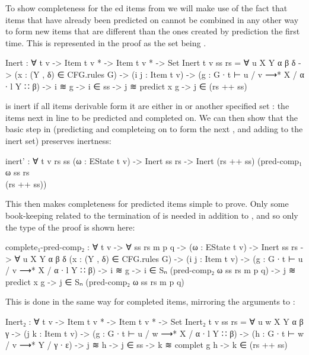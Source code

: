 		To show completeness for the ed items from
		 we will make use of the fact that items that have
		already been predicted on cannot be combined in any other way to form
		new items that are different than the ones created by prediction the
		first time. This is represented in the proof as the set 
		being .

		\begin{code}
			Inert : ∀ {t v} -> Item t v * -> Item t v * -> Set
			Inert {t} {v} ss rs =
			  ∀ {u X Y α β δ} ->
			  (x : (Y , δ) ∈ CFG.rules G) ->
			  (i j : Item t v) ->
			  (g : G ∙ t ⊢ u / v ⟶* X / α ∙ l Y ∷ β) ->
			  i ≋ g -> i ∈ ss ->
			  j ≋ predict x g ->
			    j ∈ (rs ++ ss)
		\end{code}

		 is inert if all items derivable form it are either in
		 or another specified set : the items next in
		line to be predicted and completed on. We can then show that the basic
		step in  (predicting and completeing on 
		to form the next , and adding  to the inert set)
		preserves inertness:

		\begin{code}
			inert' : ∀ {t v rs ss} (ω : EState t v) ->
			  Inert ss rs -> Inert (rs ++ ss) (pred-comp₁ ω ss rs \\ (rs ++ ss))
		\end{code}

		This then makes completeness for  predicted items
		simple to prove. Only some book-keeping related to the termination of
		 is needed in addition to , and so
		only the type of the proof is shown here:

		\begin{code}
			complete₁-pred-comp₂ : ∀ {t v} -> ∀ ss rs m p q ->
			  (ω : EState t v) ->
			  Inert ss rs ->
			  ∀ {u X Y α β δ}
			  (x : (Y , δ) ∈ CFG.rules G) ->
			  (i j : Item t v) ->
			  (g : G ∙ t ⊢ u / v ⟶* X / α ∙ l Y ∷ β) ->
			  i ≋ g ->
			  i ∈ Sₙ (pred-comp₂ ω ss rs m p q) ->
			  j ≋ predict x g ->
			    j ∈ Sₙ (pred-comp₂ ω ss rs m p q)
		\end{code}

		This is done in the same way for completed items, mirroring the
		arguments to :

		\begin{code}
			Inert₂ : ∀ {t v} -> Item t v * -> Item t v * -> Set
			Inert₂ {t} {v} ss rs =
			  ∀ {u w X Y α β γ} ->
			  (j k : Item t v) ->
			  (g : G ∙ t ⊢ u / w ⟶* X / α ∙ l Y ∷ β) ->
			  (h : G ∙ t ⊢ w / v ⟶* Y / γ ∙ ε) ->
			  j ≋ h -> j ∈ ss ->
			  k ≋ complet g h ->
			    k ∈ (rs ++ ss)
		\end{code}

